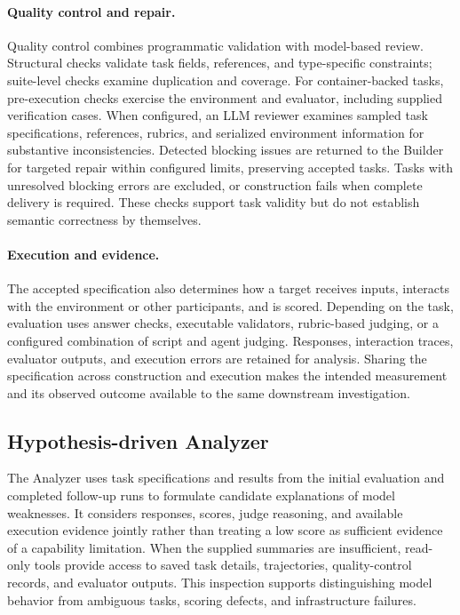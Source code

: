 \documentclass{article} %
\begin{document}
\paragraph{Quality control and repair.}
Quality control combines programmatic validation with model-based review. Structural checks validate task fields, references, and type-specific constraints; suite-level checks examine duplication and coverage. For container-backed tasks, pre-execution checks exercise the environment and evaluator, including supplied verification cases. When configured, an LLM reviewer examines sampled task specifications, references, rubrics, and serialized environment information for substantive inconsistencies. Detected blocking issues are returned to the Builder for targeted repair within configured limits, preserving accepted tasks. Tasks with unresolved blocking errors are excluded, or construction fails when complete delivery is required. These checks support task validity but do not establish semantic correctness by themselves.

\paragraph{Execution and evidence.}
The accepted specification also determines how a target receives inputs, interacts with the environment or other participants, and is scored. Depending on the task, evaluation uses answer checks, executable validators, rubric-based judging, or a configured combination of script and agent judging. Responses, interaction traces, evaluator outputs, and execution errors are retained for analysis. Sharing the specification across construction and execution makes the intended measurement and its observed outcome available to the same downstream investigation.

\subsection{Hypothesis-driven Analyzer}\label{sec:analyzer}

The Analyzer uses task specifications and results from the initial evaluation and completed follow-up runs to formulate candidate explanations of model weaknesses. It considers responses, scores, judge reasoning, and available execution evidence jointly rather than treating a low score as sufficient evidence of a capability limitation. When the supplied summaries are insufficient, read-only tools provide access to saved task details, trajectories, quality-control records, and evaluator outputs. This inspection supports distinguishing model behavior from ambiguous tasks, scoring defects, and infrastructure failures.
\end{document}
